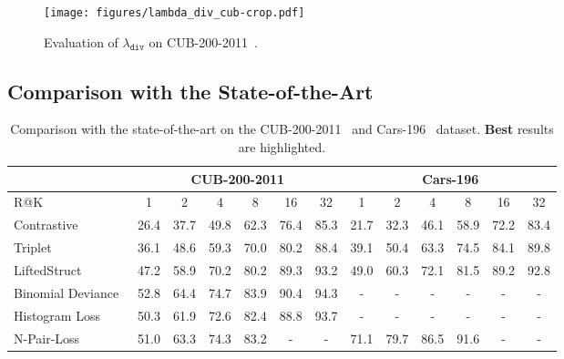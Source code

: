 \documentclass[10pt,journal,compsoc]{IEEEtran}
\begin{document}
\begin{figure}[htbp]
    \begin{center}
        \texttt{[image: figures/lambda\_div\_cub-crop.pdf]}
    \end{center}
    \caption{Evaluation of $\lambda_{\texttt{div}}$ on CUB-200-2011~\cite{WahCUB_200_2011}.}
    \label{fig:eval_lambda_div_cub}
\end{figure}\subsection{Comparison with the State-of-the-Art}\label{sec:eval-sota}\begin{table*}[!htbp]
    \caption{Comparison with the state-of-the-art on the CUB-200-2011~\cite{WahCUB_200_2011} and Cars-196~\cite{krause20133d} dataset. \textbf{Best} results are highlighted.}
    \label{tbl:sota-cub-200-2011-cars-196}
    \renewcommand{\arraystretch}{1.3}
    \centering
    \begin{tabular}{l|cccccc|cccccc}
        \hline
        & \multicolumn{6}{c}{CUB-200-2011} & \multicolumn{6}{c}{Cars-196} \\
        \hline
        R@K                                            & 1     & 2     & 4    & 8    & 16   & 32                                       & 1 & 2 & 4 & 8 & 16 & 32  \\
        \hline
        Contrastive~\cite{oh2016deep}                  & 26.4  & 37.7  & 49.8 & 62.3 & 76.4 & 85.3                                     & 21.7 & 32.3 & 46.1 & 58.9 & 72.2 & 83.4 \\
        Triplet~\cite{oh2016deep}                      & 36.1  & 48.6  & 59.3 & 70.0 & 80.2 & 88.4                                     & 39.1  & 50.4  & 63.3 & 74.5 & 84.1 & 89.8 \\
        LiftedStruct~\cite{oh2016deep}                 & 47.2  & 58.9  & 70.2 & 80.2 & 89.3 & 93.2                                     & 49.0 & 60.3 & 72.1 & 81.5 & 89.2 & 92.8 \\
        Binomial Deviance~\cite{ustinova2016histogram} & 52.8  & 64.4  & 74.7 & 83.9 & 90.4 & 94.3                                     & - & -  & - & - & - & - \\
        Histogram Loss~\cite{ustinova2016histogram}    & 50.3  & 61.9  & 72.6 & 82.4 & 88.8 & 93.7                                     & - & - & - & - & - & - \\
        N-Pair-Loss~\cite{sohn2016improved}            & 51.0  & 63.3  & 74.3 & 83.2 & -    & -                                        & 71.1 & 79.7 & 86.5 & 91.6 & -    & -   \\

\end{tabular}
\end{table*}
\end{document}
